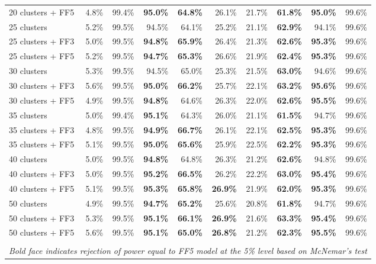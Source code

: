 \begin{table}[!h]
\begin{center}
\begin{tabular}{lrrrrrrrrr}
20 clusters + FF5	& 4.8\% & 99.4\% & \textbf{95.0\%} & \textbf{64.8\%} & 26.1\% & 21.7\% & \textbf{61.8\%} & \textbf{95.0\%} & 99.6\% \\
25 clusters	& 5.2\% & 99.5\% & 94.5\% & 64.1\% & 25.2\% & 21.1\% & \textbf{62.9\%} & 94.1\% & 99.6\% \\
25 clusters + FF3	& 5.0\% & 99.5\% & \textbf{94.8\%} & \textbf{65.9\%} & 26.4\% & 21.3\% & \textbf{62.6\%} & \textbf{95.3\%} & 99.6\% \\
25 clusters + FF5	& 5.2\% & 99.5\% & \textbf{94.7\%} & \textbf{65.3\%} & 26.6\% & 21.9\% & \textbf{62.4\%} & \textbf{95.3\%} & 99.6\% \\
30 clusters	& 5.3\% & 99.5\% & 94.5\% & 65.0\% & 25.3\% & 21.5\% & \textbf{63.0\%} & 94.6\% & 99.6\% \\
30 clusters + FF3	& 5.6\% & 99.5\% & \textbf{95.0\%} & \textbf{66.2\%} & 25.7\% & 22.1\% & \textbf{63.2\%} & \textbf{95.6\%} & 99.6\% \\
30 clusters + FF5	& 4.9\% & 99.5\% & \textbf{94.8\%} & 64.6\% & 26.3\% & 22.0\% & \textbf{62.6\%} & \textbf{95.5\%} & 99.6\% \\
35 clusters	& 5.0\% & 99.4\% & \textbf{95.1\%} & 64.3\% & 26.0\% & 21.1\% & \textbf{61.5\%} & 94.7\% & 99.6\% \\
35 clusters + FF3	& 4.8\% & 99.5\% & \textbf{94.9\%} & \textbf{66.7\%} & 26.1\% & 22.1\% & \textbf{62.5\%} & \textbf{95.3\%} & 99.6\% \\
35 clusters + FF5	& 5.1\% & 99.5\% & \textbf{95.0\%} & \textbf{65.6\%} & 25.9\% & 22.5\% & \textbf{62.2\%} & \textbf{95.3\%} & 99.6\% \\
40 clusters	& 5.0\% & 99.5\% & \textbf{94.8\%} & 64.8\% & 26.3\% & 21.2\% & \textbf{62.6\%} & 94.8\% & 99.6\% \\
40 clusters + FF3	& 5.0\% & 99.5\% & \textbf{95.2\%} & \textbf{66.5\%} & 26.2\% & 22.2\% & \textbf{63.0\%} & \textbf{95.4\%} & 99.6\% \\
40 clusters + FF5	& 5.1\% & 99.5\% & \textbf{95.3\%} & \textbf{65.8\%} & \textbf{26.9\%} & 21.9\% & \textbf{62.0\%} & \textbf{95.3\%} & 99.6\% \\
50 clusters	& 4.9\% & 99.5\% & \textbf{94.7\%} & \textbf{65.2\%} & 25.6\% & 20.8\% & \textbf{61.8\%} & 94.7\% & 99.6\% \\
50 clusters + FF3	& 5.3\% & 99.5\% & \textbf{95.1\%} & \textbf{66.1\%} & \textbf{26.9\%} & 21.6\% & \textbf{63.3\%} & \textbf{95.4\%} & 99.6\% \\
50 clusters + FF5	& 5.6\% & 99.5\% & \textbf{95.1\%} & \textbf{65.0\%} & \textbf{26.8\%} & 21.2\% & \textbf{62.3\%} & \textbf{95.5\%} & 99.6\% \\
\hline\\
\multicolumn{10}{l}{\itshape Bold face indicates rejection of power equal to FF5 model at the 5\% level based on McNemar's test}
    \end{tabular}
    \end{center}
\end{table}
